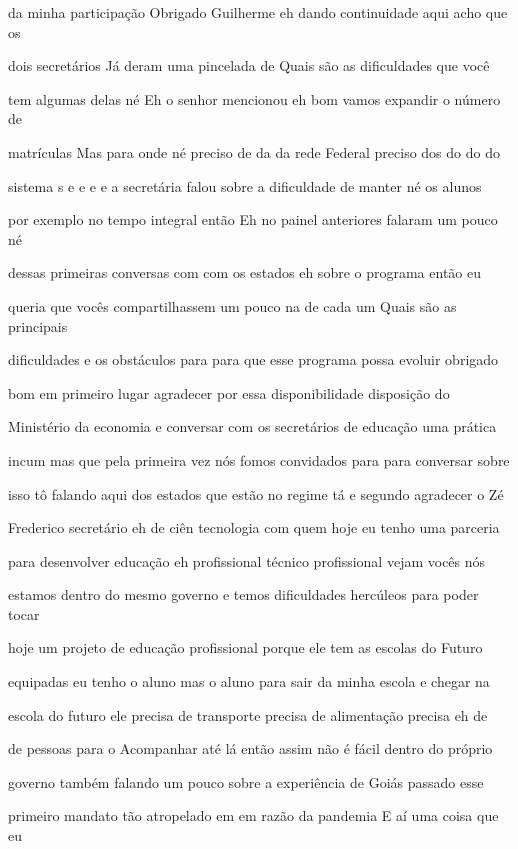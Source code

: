 \documentclass[a4paper,12pt]{article}
\begin{document}
da minha participação Obrigado Guilherme eh dando continuidade aqui acho que os

dois secretários Já deram uma pincelada de Quais são as dificuldades que você

tem algumas delas né Eh o senhor mencionou eh bom vamos expandir o número de

matrículas Mas para onde né preciso de da da rede Federal preciso dos do do do

sistema s e e e e a secretária falou sobre a dificuldade de manter né os alunos

por exemplo no tempo integral então Eh no painel anteriores falaram um pouco né

dessas primeiras conversas com com os estados eh sobre o programa então eu

queria que vocês compartilhassem um pouco na de cada um Quais são as principais

dificuldades e os obstáculos para para que esse programa possa evoluir obrigado

bom em primeiro lugar agradecer por essa disponibilidade disposição do

Ministério da economia e conversar com os secretários de educação uma prática

incum mas que pela primeira vez nós fomos convidados para para conversar sobre

isso tô falando aqui dos estados que estão no regime tá e segundo agradecer o Zé

Frederico secretário eh de ciên tecnologia com quem hoje eu tenho uma parceria

para desenvolver educação eh profissional técnico profissional vejam vocês nós

estamos dentro do mesmo governo e temos dificuldades hercúleos para poder tocar

hoje um projeto de educação profissional porque ele tem as escolas do Futuro

equipadas eu tenho o aluno mas o aluno para sair da minha escola e chegar na

escola do futuro ele precisa de transporte precisa de alimentação precisa eh de

de pessoas para o Acompanhar até lá então assim não é fácil dentro do próprio

governo também falando um pouco sobre a experiência de Goiás passado esse

primeiro mandato tão atropelado em em razão da pandemia E aí uma coisa que eu
\end{document}
